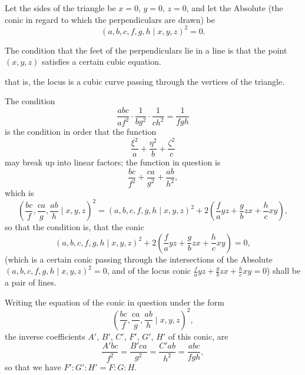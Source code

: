 \documentclass[11pt,a4paper]{article}
\theoremstyle{plain}
\begin{document}
Let the sides of the triangle be $x = 0$, $y = 0$, $z = 0$, and let the Absolute (the conic in regard to which the perpendiculars are drawn) be
\begin{equation}
(a, b, c, f, g, h \mid x, y, z)^2 = 0.
\end{equation}

The condition that the feet of the perpendiculars lie in a line is that the point $(x, y, z)$ satisfies a certain cubic equation.

\newpage
\setcounter{equation}{2}

that is, the locus is a cubic curve passing through the vertices of the triangle.

The condition
\begin{equation}
\frac{abc}{af^2} \cdot \frac{1}{bg^2} \cdot \frac{1}{ch^2} = \frac{1}{fgh}
\end{equation}
is the condition in order that the function
\begin{equation}
\frac{\xi^2}{a} + \frac{\eta^2}{b} + \frac{\zeta^2}{c}
\end{equation}
may break up into linear factors; the function in question is
\begin{equation}
\frac{bc}{f^2} + \frac{ca}{g^2} + \frac{ab}{h^2},
\end{equation}
which is
\begin{equation}
\left(\frac{bc}{f}, \frac{ca}{g}, \frac{ab}{h} \mid x, y, z\right)^2 = (a, b, c, f, g, h \mid x, y, z)^2 + 2\left(\frac{f}{a}yz + \frac{g}{b}zx + \frac{h}{c}xy\right),
\end{equation}
so that the condition is, that the conic
\begin{equation}
(a, b, c, f, g, h \mid x, y, z)^2 + 2\left(\frac{f}{a}yz + \frac{g}{b}zx + \frac{h}{c}xy\right) = 0,
\end{equation}
(which is a certain conic passing through the intersections of the Absolute $(a, b, c, f, g, h \mid x, y, z)^2 = 0$, and of the locus conic $\frac{f}{a}yz + \frac{g}{b}zx + \frac{h}{c}xy = 0$) shall be a pair of lines.

\newpage
\setcounter{equation}{7}

Writing the equation of the conic in question under the form
\begin{equation}
\left(\frac{bc}{f}, \frac{ca}{g}, \frac{ab}{h} \mid x, y, z\right)^2,
\end{equation}
the inverse coefficients $A'$, $B'$, $C'$, $F'$, $G'$, $H'$ of this conic, are
\begin{equation}
\frac{A'bc}{f^2} = \frac{B'ca}{g^2} = \frac{C'ab}{h^2} = \frac{abc}{fgh},
\end{equation}
so that we have $F' : G' : H' = F : G : H$.
\end{document}
